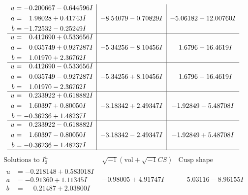 \documentclass[1p]{elsarticle_modified}
\theoremstyle{definition}
\newcommand{\I}{\sqrt{-1}}
\begin{document}
$$\begin{array}{c|c|c}
\begin{aligned}
u &= -0.200667 - 0.644596 I \\
a &= \phantom{-}1.98028 + 0.41743 I \\
b &= -1.72532 - 0.25249 I\end{aligned}
 & -8.54079 - 0.70829 I & -5.06182 + 12.00760 I \\ \hline\begin{aligned}
u &= \phantom{-}0.412690 + 0.533656 I \\
a &= \phantom{-}0.035749 + 0.927287 I \\
b &= \phantom{-}1.01970 + 2.36762 I\end{aligned}
 & -5.34256 - 8.10456 I & \phantom{-}1.6796 + 16.4619 I \\ \hline\begin{aligned}
u &= \phantom{-}0.412690 - 0.533656 I \\
a &= \phantom{-}0.035749 - 0.927287 I \\
b &= \phantom{-}1.01970 - 2.36762 I\end{aligned}
 & -5.34256 + 8.10456 I & \phantom{-}1.6796 - 16.4619 I \\ \hline\begin{aligned}
u &= \phantom{-}0.233922 + 0.618882 I \\
a &= \phantom{-}1.60397 + 0.80050 I \\
b &= -0.36236 + 1.48237 I\end{aligned}
 & -3.18342 + 2.49347 I & -1.92849 - 5.48708 I \\ \hline\begin{aligned}
u &= \phantom{-}0.233922 - 0.618882 I \\
a &= \phantom{-}1.60397 - 0.80050 I \\
b &= -0.36236 - 1.48237 I\end{aligned}
 & -3.18342 - 2.49347 I & -1.92849 + 5.48708 I\\
 \hline 
 \end{array}$$\newpage$$\begin{array}{c|c|c}  
\text{Solutions to }I^u_{2}& \I (\text{vol} + \sqrt{-1}CS) & \text{Cusp shape}\\
 \hline 
\begin{aligned}
u &= -0.218148 + 0.583018 I \\
a &= -0.91360 + 1.11345 I \\
b &= \phantom{-}0.21487 + 2.03800 I\end{aligned}
 & -0.98005 + 4.91747 I & \phantom{-}5.03116 - 8.96155 I \\ \hline\begin{aligned}

\end{aligned}
\end{array}$$
\end{document}
